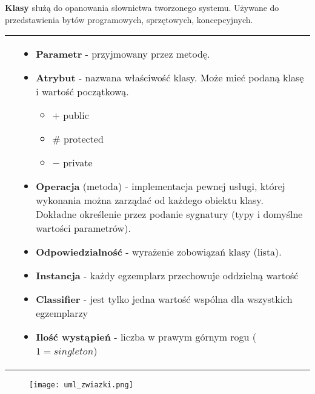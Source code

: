 \documentclass[a4paper]{article}
\begin{document}
    \textbf{Klasy} służą do opanowania słownictwa tworzonego systemu. Używane do przedstawienia bytów programowych, sprzętowych,
    koncepcyjnych.


    \begin{table}[H]
        \begin{center}
            \begin{tabular}{ c p{8cm} }
                \raisebox{-\totalheight}{\texttt{[image: diagram\_klasy.png]}}
                &
                \begin{itemize}
                    \item \textbf{Parametr} - przyjmowany przez metodę.
                    \item \textbf{Atrybut} - nazwana właściwość klasy. Może mieć podaną klasę i wartość początkową.
                    \begin{itemize}
                        \item $+$  public
                        \item \# protected
                        \item $-$ private
                    \end{itemize}
                    \item \textbf{Operacja} (metoda) - implementacja pewnej usługi, której wykonania można zarządać
                    od każdego obiektu klasy. Dokładne określenie przez podanie sygnatury (typy i domyślne wartości parametrów).
                    \item \textbf{Odpowiedzialność} - wyrażenie zobowiązań klasy (lista).

                    \item \textbf{Instancja} - każdy egzemplarz przechowuje oddzielną wartość
                    \item \textbf{Classifier} - jest tylko jedna wartość wspólna dla wszystkich egzemplarzy
                    \item \textbf{Ilość wystąpień} - liczba w prawym górnym rogu ($1 = singleton$)
                \end{itemize}
                \\
            \end{tabular}
        \end{center}
    \end{table}


    \begin{figure}[H]
        \texttt{[image: uml\_zwiazki.png]}
    \end{figure}
\end{document}
